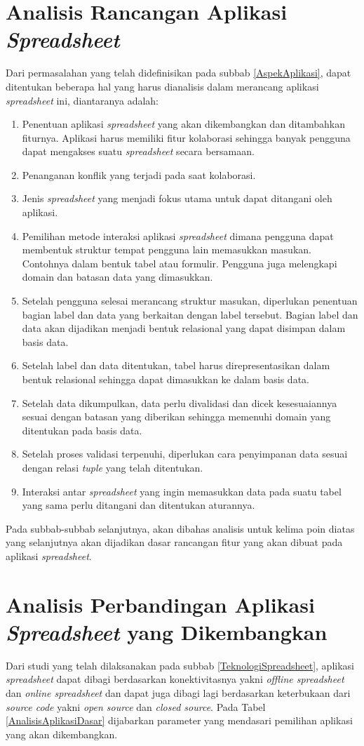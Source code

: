 \section{Analisis Rancangan Aplikasi \textit{Spreadsheet}}
Dari permasalahan yang telah didefinisikan pada subbab \ref{AspekAplikasi}, dapat ditentukan beberapa hal yang harus dianalisis dalam merancang aplikasi \textit{spreadsheet} ini, diantaranya adalah:
\begin{enumerate}
	\item Penentuan aplikasi \textit{spreadsheet} yang akan dikembangkan dan ditambahkan fiturnya. Aplikasi harus memiliki fitur kolaborasi sehingga banyak pengguna dapat mengakses suatu \textit{spreadsheet} secara bersamaan.
	\item Penanganan konflik yang terjadi pada saat kolaborasi.
	\item Jenis \textit{spreadsheet} yang menjadi fokus utama untuk dapat ditangani oleh aplikasi.
	\item Pemilihan metode interaksi aplikasi \textit{spreadsheet} dimana pengguna dapat membentuk struktur tempat pengguna lain memasukkan masukan. Contohnya dalam bentuk tabel atau formulir. Pengguna juga melengkapi domain dan batasan data yang dimasukkan.
	\item Setelah pengguna selesai merancang struktur masukan, diperlukan penentuan bagian label dan data yang berkaitan dengan label tersebut. Bagian label dan data akan dijadikan menjadi bentuk relasional yang dapat disimpan dalam basis data.
	\item Setelah label dan data ditentukan, tabel harus direpresentasikan dalam bentuk relasional sehingga dapat dimasukkan ke dalam basis data.
	\item Setelah data dikumpulkan, data perlu divalidasi dan dicek kesesuaiannya sesuai dengan batasan yang diberikan sehingga memenuhi domain yang ditentukan pada basis data.
	\item Setelah proses validasi terpenuhi, diperlukan cara penyimpanan data sesuai dengan relasi \textit{tuple} yang telah ditentukan.
	\item Interaksi antar \textit{spreadsheet} yang ingin memasukkan data pada suatu tabel yang sama perlu ditangani dan ditentukan aturannya.
\end{enumerate}
Pada subbab-subbab selanjutnya, akan dibahas analisis untuk kelima poin diatas yang selanjutnya akan dijadikan dasar rancangan fitur yang akan dibuat pada aplikasi \textit{spreadsheet}.

\section{Analisis Perbandingan Aplikasi \textit{Spreadsheet} yang Dikembangkan}
Dari studi yang telah dilaksanakan pada subbab \ref{TeknologiSpreadsheet}, aplikasi \textit{spreadsheet} dapat dibagi berdasarkan konektivitasnya yakni \textit{offline spreadsheet} dan \textit{online spreadsheet} dan dapat juga dibagi lagi berdasarkan keterbukaan dari \textit{source code} yakni \textit{open source} dan \textit{closed source}. Pada Tabel \ref{AnalisisAplikasiDasar} dijabarkan parameter yang mendasari pemilihan aplikasi yang akan dikembangkan.

